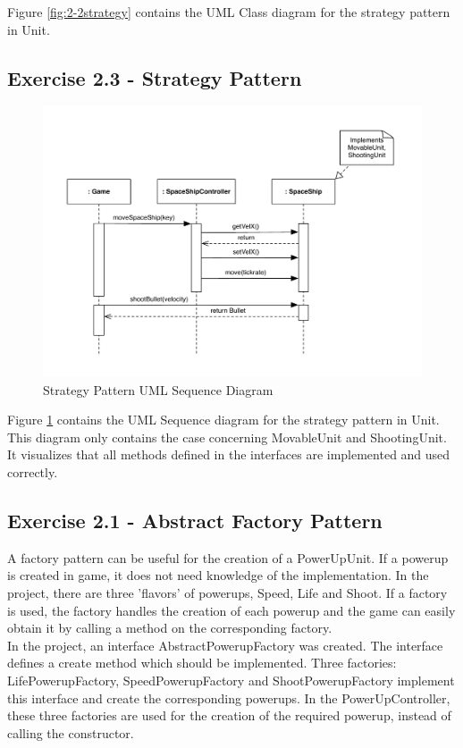 Figure \ref{fig:2-2strategy} contains the UML Class diagram for the strategy pattern in Unit.

\subsection{Exercise 2.3 - Strategy Pattern}

\begin{figure}[ht!]
\centering
\includegraphics[width=15cm]{SI-Sequence-Strategy.pdf}
\caption{Strategy Pattern UML Sequence Diagram}
\label{fig:2-3strategy}
\end{figure}

Figure \ref{fig:2-3strategy} contains the UML Sequence diagram for the strategy pattern in Unit. This diagram only contains the case concerning MovableUnit and ShootingUnit. It visualizes that all methods defined in the interfaces are implemented and used correctly.

\subsection{Exercise 2.1 - Abstract Factory Pattern}
A factory pattern can be useful for the creation of a PowerUpUnit. If a powerup is created in game, it does not need knowledge of the implementation. In the project, there are three 'flavors' of powerups, Speed, Life and Shoot. If a factory is used, the factory handles the creation of each powerup and the game can easily obtain it by calling a method on the corresponding factory.\\

In the project, an interface AbstractPowerupFactory was created. The interface defines a create method which should be implemented. Three factories: LifePowerupFactory, SpeedPowerupFactory and ShootPowerupFactory implement this interface and create the corresponding powerups. In the PowerUpController, these three factories are used for the creation of the required powerup, instead of calling the constructor. 

